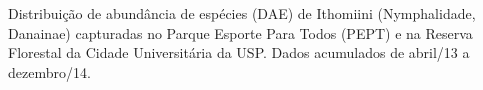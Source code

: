 \label{fig:2.1.2} Distribuição de abundância de espécies (DAE) de Ithomiini (Nymphalidade, Danainae) capturadas no Parque Esporte Para Todos (PEPT) e na Reserva Florestal da Cidade Universitária da USP. Dados acumulados de abril/13 a dezembro/14.




